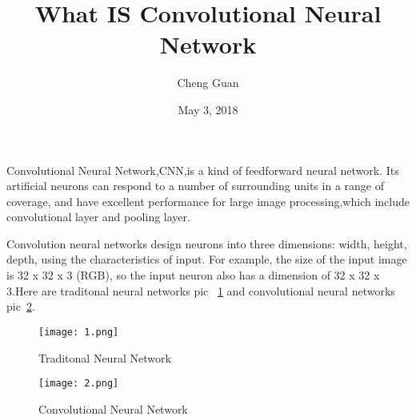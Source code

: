 \documentclass[12pt]{article}
\begin{document}
\title{What IS Convolutional Neural Network}
\author{Cheng Guan}
\date{May 3, 2018}
\maketitle
\setlength{\baselineskip}{20pt}

  Convolutional Neural Network,CNN,is a kind of feedforward neural network.
  Its artificial neurons can respond to a number of surrounding units in a range of coverage,
  and have excellent performance for large image processing,which include
  convolutional layer and pooling layer.\cite{test2}

  Convolution neural networks design neurons into three dimensions:
   width, height, depth, using the characteristics of input.
   For example, the size of the input image is 32 x 32 x 3 (RGB),
   so the input neuron also has a dimension of 32 x 32 x 3.Here are traditonal
  neural networks pic ~\ref{fig1} and convolutional neural networks pic~\ref{fig2}.

\begin{figure}[ht]
 \centering
 \texttt{[image: 1.png]}
 \caption{Traditonal Neural Network}
 \label{fig1}
\end{figure}
\begin{figure}[htb!p]
\texttt{[image: 2.png]}
\caption{Convolutional Neural Network}
\label{fig2}
\end{figure}



\end{document}
